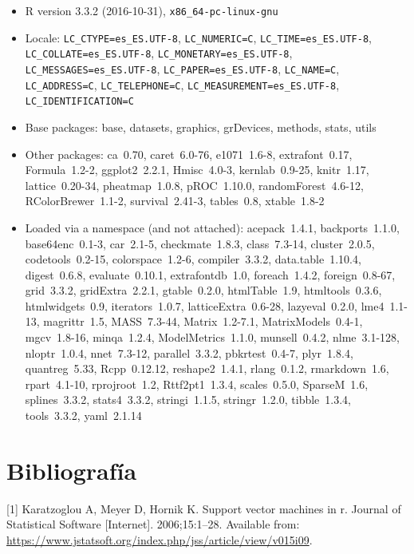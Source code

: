 \documentclass[12pt,spanish,a4paper]{article}
\numberwithin{equation}{section}
\begin{document}
\begin{itemize}\raggedright
  \item R version 3.3.2 (2016-10-31), \verb|x86_64-pc-linux-gnu|
  \item Locale: \verb|LC_CTYPE=es_ES.UTF-8|, \verb|LC_NUMERIC=C|, \verb|LC_TIME=es_ES.UTF-8|, \verb|LC_COLLATE=es_ES.UTF-8|, \verb|LC_MONETARY=es_ES.UTF-8|, \verb|LC_MESSAGES=es_ES.UTF-8|, \verb|LC_PAPER=es_ES.UTF-8|, \verb|LC_NAME=C|, \verb|LC_ADDRESS=C|, \verb|LC_TELEPHONE=C|, \verb|LC_MEASUREMENT=es_ES.UTF-8|, \verb|LC_IDENTIFICATION=C|
  \item Base packages: base, datasets, graphics, grDevices,
    methods, stats, utils
  \item Other packages: ca~0.70, caret~6.0-76, e1071~1.6-8,
    extrafont~0.17, Formula~1.2-2, ggplot2~2.2.1, Hmisc~4.0-3,
    kernlab~0.9-25, knitr~1.17, lattice~0.20-34, pheatmap~1.0.8,
    pROC~1.10.0, randomForest~4.6-12, RColorBrewer~1.1-2,
    survival~2.41-3, tables~0.8, xtable~1.8-2
  \item Loaded via a namespace (and not attached): acepack~1.4.1,
    backports~1.1.0, base64enc~0.1-3, car~2.1-5, checkmate~1.8.3,
    class~7.3-14, cluster~2.0.5, codetools~0.2-15,
    colorspace~1.2-6, compiler~3.3.2, data.table~1.10.4,
    digest~0.6.8, evaluate~0.10.1, extrafontdb~1.0, foreach~1.4.2,
    foreign~0.8-67, grid~3.3.2, gridExtra~2.2.1, gtable~0.2.0,
    htmlTable~1.9, htmltools~0.3.6, htmlwidgets~0.9,
    iterators~1.0.7, latticeExtra~0.6-28, lazyeval~0.2.0,
    lme4~1.1-13, magrittr~1.5, MASS~7.3-44, Matrix~1.2-7.1,
    MatrixModels~0.4-1, mgcv~1.8-16, minqa~1.2.4,
    ModelMetrics~1.1.0, munsell~0.4.2, nlme~3.1-128, nloptr~1.0.4,
    nnet~7.3-12, parallel~3.3.2, pbkrtest~0.4-7, plyr~1.8.4,
    quantreg~5.33, Rcpp~0.12.12, reshape2~1.4.1, rlang~0.1.2,
    rmarkdown~1.6, rpart~4.1-10, rprojroot~1.2, Rttf2pt1~1.3.4,
    scales~0.5.0, SparseM~1.6, splines~3.3.2, stats4~3.3.2,
    stringi~1.1.5, stringr~1.2.0, tibble~1.3.4, tools~3.3.2,
    yaml~2.1.14
\end{itemize}

\section*{Bibliografía}\label{bibliografia}

\hypertarget{refs}{}
\hypertarget{ref-JSSv015i09}{}
{[}1{]} Karatzoglou A, Meyer D, Hornik K. Support vector machines in r.
Journal of Statistical Software {[}Internet{]}. 2006;15:1--28. Available
from:
\url{https://www.jstatsoft.org/index.php/jss/article/view/v015i09}.
\end{document}
